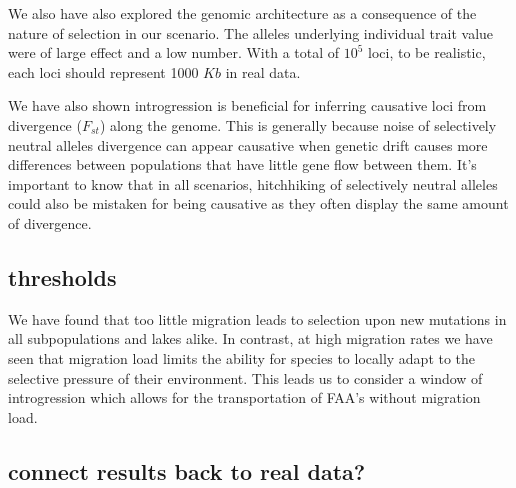 \documentclass{article}
\begin{document}
We also have also explored the genomic architecture as a consequence of the nature of selection in our scenario. The alleles underlying individual trait value were of large effect and a low number. With a total of $10^{5}$ loci, to be realistic, each loci should represent 1000 $Kb$ in real data.

We have also shown introgression is beneficial for inferring causative loci from divergence ($F_{st}$) along the genome. 
This is generally because noise of selectively neutral alleles divergence can appear causative when genetic drift causes more 
differences between populations that have little gene flow between them.
It's important to know that in all scenarios, hitchhiking of selectively neutral alleles could also be 
mistaken for being causative as they often display the same amount of divergence.




\subsection*{thresholds}

We have found that too little migration leads to selection upon new mutations in all subpopulations and lakes alike. In contrast, at high migration rates we have seen that migration load limits the ability for species to locally adapt to the selective pressure of their environment. This leads us to consider a window of introgression which allows for the transportation of FAA's without migration load. 

\subsection*{connect results back to real data?}
\end{document}

